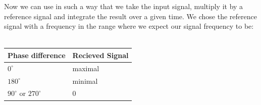 Now we can 
use in such a way that we take the input signal, multiply it by a
reference signal and integrate the result over a given time.
We chose the reference signal with a frequency in the range where we
expect our signal frequency to be: \\\\
\begin{tabular}{l|l}
    \textbf{Phase difference} & \textbf{Recieved Signal} \\
    \hline
    $0^\circ$ & maximal\\
    $180^{\circ}$ & minimal \\
    $90^\circ$ or $270^\circ$ & 0 
\end{tabular}
\vspace{0.5cm}\\\\

